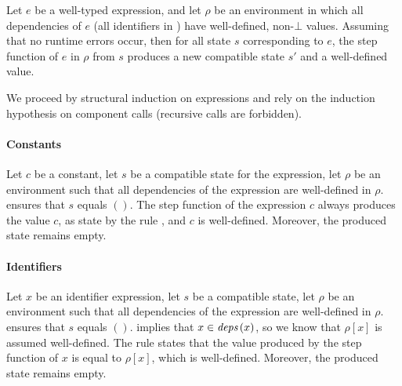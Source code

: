 \begin{lemma}
    \label{lem:semantics:grsync:theorems:productivity:expression}
    Let $e$ be a well-typed \GRSync expression, and let $\rho$ be an environment in which all
    dependencies of $e$ (\ie all identifiers in ) have well-defined, non-$\bot$ values.
    Assuming that no runtime errors occur, then for all state $s$ corresponding to $e$, the step
    function of $e$ in $\rho$ from $s$ produces a new compatible state $s'$ and a well-defined
    value.
\end{lemma}
\begin{skippableproof}
    We proceed by structural induction on expressions and rely on the induction hypothesis on
    component calls (recursive calls are forbidden).

    \paragraph{Constants}
    Let $c$ be a constant, let $s$ be a compatible state for the expression, let $\rho$ be an
    environment such that all dependencies of the expression are well-defined in $\rho$.
     ensures that $s$ equals $()$.
    The step function of the expression $c$ always produces the value $c$, as state by the rule
    , and $c$ is well-defined. Moreover, the produced
    state remains empty.

    \paragraph{Identifiers}
    Let $x$ be an identifier expression, let $s$ be a compatible state, let $\rho$ be an environment
    such that all dependencies of the expression are well-defined in $\rho$.
     ensures that $s$ equals $()$.
     implies that $x \in {\ensuremath{\textit{deps}\left(x\right)}}$,
    so we know that $\rho[x]$ is assumed well-defined.
    The rule  states that the value produced by
    the step function of $x$ is equal to $\rho[x]$, which is well-defined. Moreover, the produced
    state remains empty.


\end{skippableproof}
